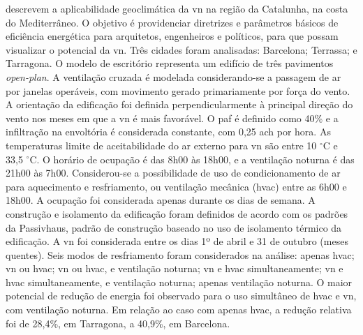 \documentclass[brazil,hardcopy,openany]{ufscthesis} %
\begin{document}
 descrevem a aplicabilidade geoclimática da \acrshort{vn} na região da Catalunha, na costa do Mediterrâneo. O objetivo é providenciar diretrizes e parâmetros básicos de eficiência energética para arquitetos, engenheiros e políticos, para que possam visualizar o potencial da \acrshort{vn}. Três cidades foram analisadas: Barcelona; Terrassa; e Tarragona. O modelo de escritório representa um edifício de três pavimentos \textit{open-plan}. A ventilação cruzada é modelada considerando-se a passagem de ar por janelas operáveis, com movimento gerado primariamente por força do vento. A orientação da edificação foi definida perpendicularmente à principal direção do vento nos meses em que a \acrshort{vn} é mais favorável. O \acrshort{paf} é definido como 40\% e a infiltração na envoltória é considerada constante, com 0,25 \acrfull{ach} por hora. As temperaturas limite de aceitabilidade do ar externo para \acrshort{vn} são entre 10 $^{\circ}$C e 33,5 $^{\circ}$C. O horário de ocupação é das 8h00 às 18h00, e a ventilação noturna é das 21h00 às 7h00. Considerou-se a possibilidade de uso de condicionamento de ar para aquecimento e resfriamento, ou ventilação mecânica (\acrshort{hvac}) entre as 6h00 e 18h00. A ocupação foi considerada apenas durante os dias de semana. A construção e isolamento da edificação foram definidos de acordo com os padrões da Passivhaus, padrão de construção baseado no uso de isolamento térmico da edificação. A \acrshort{vn} foi considerada entre os dias 1º de abril e 31 de outubro (meses quentes). Seis modos de resfriamento foram considerados na análise: apenas \acrshort{hvac}; \acrshort{vn} ou \acrshort{hvac}; \acrshort{vn} ou \acrshort{hvac}, e ventilação noturna; \acrshort{vn} e \acrshort{hvac} simultaneamente; \acrshort{vn} e \acrshort{hvac} simultaneamente, e ventilação noturna; apenas ventilação noturna. O maior potencial de redução de energia foi observado para o uso simultâneo de \acrshort{hvac} e \acrshort{vn}, com ventilação noturna. Em relação ao caso com apenas \acrshort{hvac}, a redução relativa foi de 28,4\%, em Tarragona, a 40,9\%, em Barcelona.
\end{document}
